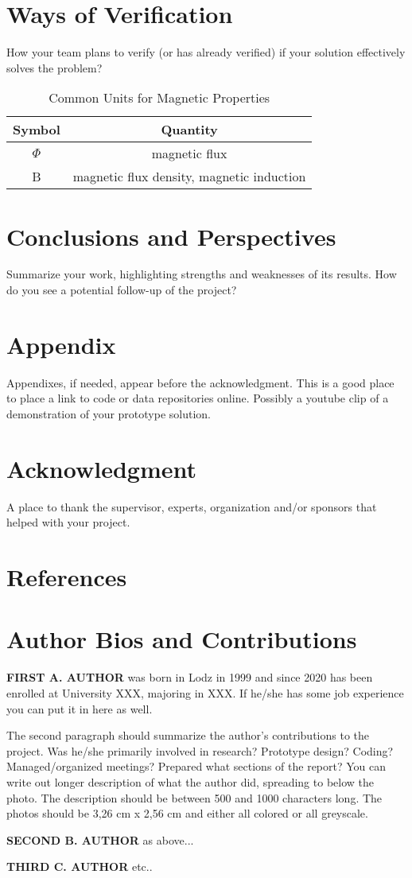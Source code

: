 \documentclass{article}
\begin{document}
\section{Ways of Verification}
How your team plans to verify (or has already verified) if your solution effectively solves the problem?

\begin{table}[h!]
    \centering
    \begin{tabular}{c c}
         Symbol & Quantity \\
         \hline
         $\Phi$ & magnetic flux \\
         B & magnetic flux density, magnetic induction
    \end{tabular}
    \caption{Common Units for Magnetic Properties}
    \label{tab:example}
\end{table}

\section{Conclusions and Perspectives}
Summarize your work, highlighting strengths and weaknesses of its results. How do you see a potential follow-up of the project?

\section*{Appendix}
Appendixes, if needed, appear before the acknowledgment. This is a good place to place a link to code or data repositories online. Possibly a youtube clip of a demonstration of your prototype solution.

\section*{Acknowledgment}
A place to thank the supervisor, experts, organization and/or sponsors that helped with your project.

\section*{References}
\printbibliography

\section*{Author Bios and Contributions}

\textbf{FIRST A. AUTHOR} was born in Lodz in 1999 and since 2020 has been enrolled at University XXX, majoring in XXX. If he/she has some job experience you can put it in here as well.

The second paragraph should summarize the author’s contributions to the project. Was he/she primarily involved in research? Prototype design? Coding? Managed/organized meetings? Prepared what sections of the report? You can write out longer description of what the author did, spreading to below the photo. The description should be between 500 and 1000 characters long. The photos should be 3,26 cm x 2,56 cm and either all colored or all greyscale.

\textbf{SECOND B. AUTHOR} as above...

\textbf{THIRD C. AUTHOR} etc..
\end{document}
